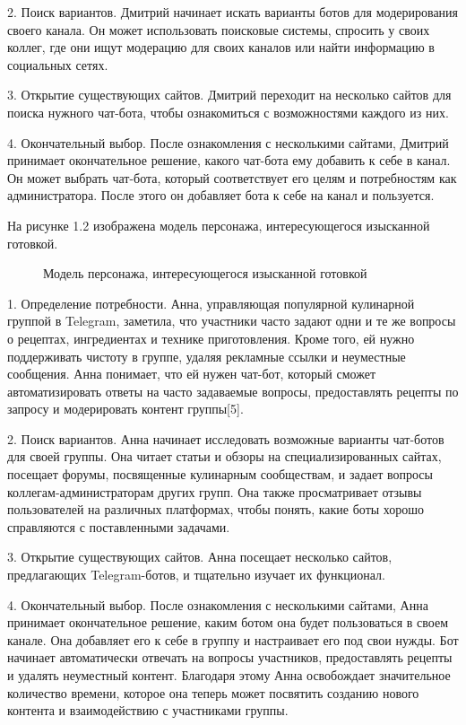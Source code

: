 2.	Поиск вариантов. Дмитрий начинает искать варианты ботов для модерирования своего канала. Он может использовать поисковые системы, спросить у своих коллег, где они ищут модерацию для своих каналов или найти информацию в социальных сетях.

3.	Открытие существующих сайтов. Дмитрий переходит на несколько сайтов для поиска нужного чат-бота, чтобы ознакомиться с возможностями каждого из них.
 
4.	Окончательный выбор. После ознакомления с несколькими сайтами, Дмитрий принимает окончательное решение, какого чат-бота ему добавить к себе в канал. Он может выбрать чат-бота, который соответствует его целям и потребностям как администратора. После этого он добавляет бота к себе на канал и пользуется.

На рисунке 1.2 изображена модель персонажа, интересующегося изысканной готовкой.

\begin{figure}
	\center{\texttt{[image: un1]}}
	\caption{Модель персонажа, интересующегося изысканной готовкой}
	\label{uml1:image}
\end{figure}


1.	Определение потребности. Анна, управляющая популярной кулинарной группой в Telegram, заметила, что участники часто задают одни и те же вопросы о рецептах, ингредиентах и технике приготовления. Кроме того, ей нужно поддерживать чистоту в группе, удаляя рекламные ссылки и неуместные сообщения. Анна понимает, что ей нужен чат-бот, который сможет автоматизировать ответы на часто задаваемые вопросы, предоставлять рецепты по запросу и модерировать контент группы[5].

2.	Поиск вариантов. Анна начинает исследовать возможные варианты чат-ботов для своей группы. Она читает статьи и обзоры на специализированных сайтах, посещает форумы, посвященные кулинарным сообществам, и задает вопросы коллегам-администраторам других групп. Она также просматривает отзывы пользователей на различных платформах, чтобы понять, какие боты хорошо справляются с поставленными задачами.

3.	Открытие существующих сайтов. Анна посещает несколько сайтов, предлагающих Telegram-ботов, и тщательно изучает их функционал. 

4.	Окончательный выбор. После ознакомления с несколькими сайтами, Анна принимает окончательное решение, каким ботом она будет пользоваться в своем канале. Она добавляет его к себе в группу и настраивает его под свои нужды. Бот начинает автоматически отвечать на вопросы участников, предоставлять рецепты и удалять неуместный контент. Благодаря этому Анна освобождает значительное количество времени, которое она теперь может посвятить созданию нового контента и взаимодействию с участниками группы.

